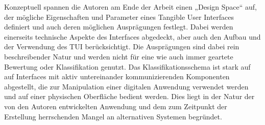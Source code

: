 Konzeptuell spannen die Autoren am Ende der Arbeit einen „Design Space“ auf, der mögliche Eigenschaften und Parameter eines Tangible User Interfaces definiert und auch deren möglichen Ausprägungen festlegt. Dabei werden einerseits technische Aspekte des Interfaces abgedeckt, aber auch den Aufbau und der Verwendung des \gls{TUI} berücksichtigt. Die Ausprägungen sind dabei rein beschreibender Natur und werden nicht für eine wie auch immer geartete Bewertung oder Klassifikation genutzt. Das Klassifikationsschema ist stark auf auf Interfaces mit aktiv untereinander kommunizierenden Komponenten abgestellt, die zur Manipulation einer digitalen Anwendung verwendet werden und auf einer physischen Oberfläche bedient werden. Dies liegt in der Natur der von den Autoren entwickelten Anwendung und dem zum Zeitpunkt der Erstellung herrschenden Mangel an alternativen Systemen begründet.

